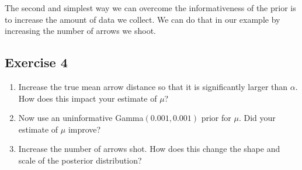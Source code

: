 The second and simplest way we can overcome the informativeness of the prior is to increase the amount of data we collect.
We can do that in our example by increasing the number of arrows we shoot.

\subsection{Exercise 4}

\begin{enumerate}[label=\textnormal{Step \arabic*)}]
	\item Increase the true mean arrow distance so that it is significantly larger than $\alpha$. How does this impact your estimate of $\mu$?
	\item Now use an uninformative Gamma$(0.001, 0.001)$ prior for $\mu$. Did your estimate of $\mu$ improve?
	\item Increase the number of arrows shot. How does this change the shape and scale of the posterior distribution?
\end{enumerate}




